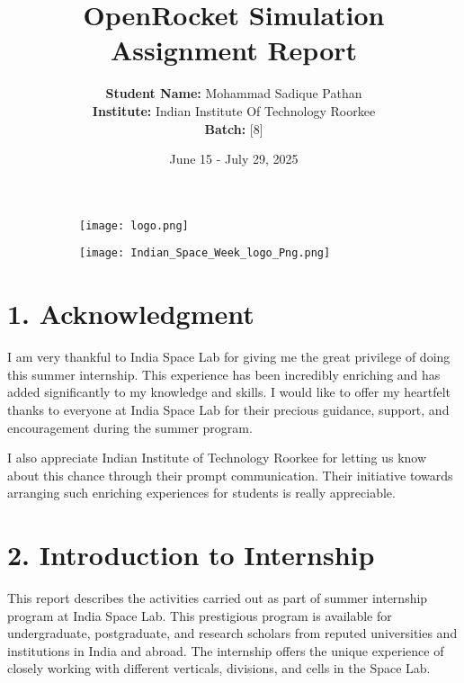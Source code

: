 \documentclass[12pt, a4paper]{article}
\begin{document}
\title{\textbf{OpenRocket Simulation Assignment Report}}
\author{\textbf{Student Name:} Mohammad Sadique Pathan \\ \textbf{Institute:} Indian Institute Of Technology Roorkee\\ \textbf{Batch:} [8]}
\date{June 15 - July 29, 2025}
\maketitle

\begin{figure}[htbp]
    \centering
    \begin{subfigure}[b]{0.48\textwidth}
        \centering
        \texttt{[image: logo.png]}
    \end{subfigure}
    \hfill %
    \begin{subfigure}[b]{0.48\textwidth}
        \centering
        \texttt{[image: Indian\_Space\_Week\_logo\_Png.png]}
    \end{subfigure}
    \label{fig:renders}
\end{figure}

\thispagestyle{empty} %
\newpage

\section*{1. Acknowledgment}
I am very thankful to India Space Lab for giving me the great privilege of doing this summer internship. This experience has been incredibly enriching and has added significantly to my knowledge and skills. I would like to offer my heartfelt thanks to everyone at India Space Lab for their precious guidance, support, and encouragement during the summer program.\par
I also appreciate Indian Institute of Technology Roorkee for letting us know about this chance through their prompt communication. Their initiative towards arranging such enriching experiences for students is really appreciable.

\section*{2. Introduction to Internship}
This report describes the activities carried out as part of summer internship program at India Space Lab. This prestigious program is available for undergraduate, postgraduate, and research scholars from reputed universities and institutions in India and abroad. The internship offers the unique experience of closely working with different verticals, divisions, and cells in the Space Lab.
\end{document}
